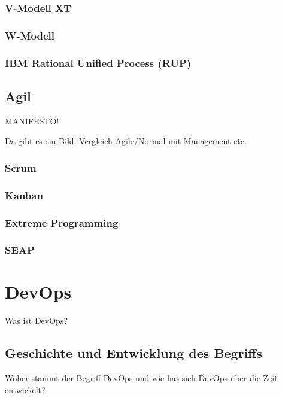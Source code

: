 \subsubsection{V-Modell XT}

\subsubsection{W-Modell}

\subsubsection{IBM Rational Unified Process (RUP)}


\subsection{Agil} %

MANIFESTO!

\parencite[Vgl.][S. XY]{6979143}  Da gibt es ein Bild. Vergleich Agile/Normal mit Management etc.

\subsubsection{Scrum}

\subsubsection{Kanban}

\subsubsection{Extreme Programming}

\subsubsection{SEAP}

\section{DevOps} %
Was ist DevOps?

\subsection{Geschichte und Entwicklung des Begriffs}
Woher stammt der Begriff DevOps und wie hat sich DevOps über die Zeit entwickelt?

